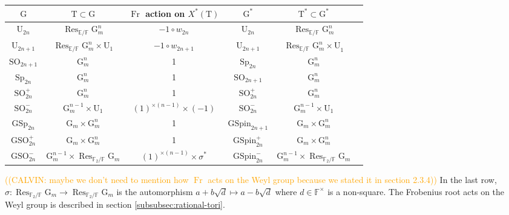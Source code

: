 \documentclass[12pt, reqno]{amsart}
\theoremstyle{definition}
\theoremstyle{definition}
\theoremstyle{definition}
\newcommand{\multiplicativegroup}[1]{#1^{\times}}
\newcommand{\SO}{\mathrm{SO}}
\newcommand{\GSO}{\mathrm{GSO}}
\newcommand{\Sp}{\mathrm{Sp}}
\newcommand{\GSp}{\mathrm{GSp}}
\newcommand{\UnitaryGroup}{\mathrm{U}}
\newcommand{\finiteField}{\mathbb{F}}
\newcommand{\quadraticExtension}{\mathbb{E}}
\newcommand{\finiteFieldExtension}[1]{\finiteField_{#1}}
\newcommand{\Frobenius}{\operatorname{Fr}}
\newcommand{\restrictionOfScalars}[3]{\operatorname{Res}_{#1 \slash #2}{#3}}
\newcommand{\multiplcativeScheme}{\algebraicGroup{G}_m}
\newcommand{\algebraicGroup}[1]{\boldsymbol{\mathrm{#1}}}
\newcommand{\CharacterLattice}[1]{X^{\ast}\left(#1\right)}
\newcommand{\calvin}[1]{\textcolor{orange}{\sffamily ((CALVIN: #1))}}
\begin{document}
\begin{center}
	\begin{tabular}{|c|c|c|c|c|c|} \hline
		$\algebraicGroup{G}$ & $\algebraicGroup{T} \subset \algebraicGroup{G}$ & $\Frobenius$ action on $\CharacterLattice{\algebraicGroup{T}}$ & $\algebraicGroup{G}^{\ast}$ & $\algebraicGroup{T}^{\ast} \subset \algebraicGroup{G}^{\ast}$ \tabularnewline \hline \hline
		$\algebraicGroup{\UnitaryGroup}_{2n}$ & $\restrictionOfScalars{\quadraticExtension}{\finiteField}{\multiplcativeScheme^{n}}$ & $-1\circ w_{2n}$ & $\algebraicGroup{\UnitaryGroup}_{2n}$ &  $\restrictionOfScalars{\quadraticExtension}{\finiteField}{\multiplcativeScheme^{n}}$ \tabularnewline \hline
		$\algebraicGroup{\UnitaryGroup}_{2n+1}$ & $\restrictionOfScalars{\quadraticExtension}{\finiteField}{\multiplcativeScheme^{n}} \times \algebraicGroup{\UnitaryGroup}_1$ & $-1 \circ w_{2n+1}$ & $\algebraicGroup{\UnitaryGroup}_{2n+1}$ &  $\restrictionOfScalars{\quadraticExtension}{\finiteField}{\multiplcativeScheme^{n} \times \algebraicGroup{\UnitaryGroup}}_1$ \tabularnewline \hline		 				 
		$\algebraicGroup{\SO}_{2n+1}$ & $\multiplcativeScheme^n$ & 1 &$\algebraicGroup{\Sp}_{2n}$ &  $\multiplcativeScheme^n$ \tabularnewline \hline
		$\algebraicGroup{\Sp}_{2n}$ & $\multiplcativeScheme^n$ & 1 &$\algebraicGroup{\SO}_{2n+1}$ & $\multiplcativeScheme^n$ \tabularnewline \hline		 
		$\algebraicGroup{\SO}^{+}_{2n}$ & $\multiplcativeScheme^n$ & 1 &$\algebraicGroup{\SO}^{+}_{2n}$ &  $\multiplcativeScheme^n$ \tabularnewline \hline
		$\algebraicGroup{\SO}^{-}_{2n}$ & $\multiplcativeScheme^{n-1} \times \algebraicGroup{\UnitaryGroup}_1$ & $\left(1\right)^{\times {\left(n-1\right)}} \times \left(-1\right)$ &$\algebraicGroup{\SO}^{-}_{2n}$ &  $\multiplcativeScheme^{n-1} \times \algebraicGroup{\UnitaryGroup}_1$ \tabularnewline \hline
		$\algebraicGroup{\GSp}_{2n}$ & $\multiplcativeScheme \times \multiplcativeScheme^{n}$ & 1 &$\algebraicGroup{GSpin}_{2n+1}$ &  $\multiplcativeScheme \times \multiplcativeScheme^{n}$ \tabularnewline \hline
		$\algebraicGroup{\GSO}^{+}_{2n}$ & $\multiplcativeScheme \times \multiplcativeScheme^{n}$ & 1 & $\algebraicGroup{GSpin}_{2n}^{+}$ &  $\multiplcativeScheme \times \multiplcativeScheme^{n}$ \tabularnewline \hline
		$\algebraicGroup{\GSO}^{-}_{2n}$ & $\multiplcativeScheme^{n-1} \times \restrictionOfScalars{\finiteFieldExtension{2}}{\finiteField}{\multiplcativeScheme}$ & $\left(1\right)^{\times {\left(n-1\right)}} \times \sigma^{\ast}$ & $\algebraicGroup{GSpin}_{2n}^{-}$ &  $\multiplcativeScheme^{n-1} \times \restrictionOfScalars{\finiteFieldExtension{2}}{\finiteField}{\multiplcativeScheme}$ \tabularnewline \hline
	\end{tabular}
\end{center}
\calvin{maybe we don't need to mention how $\Frobenius$ acts on the Weyl group because we stated it in section 2.3.4}
In the last row, $\sigma \colon \restrictionOfScalars{\finiteFieldExtension{2}}{\finiteField}{\multiplcativeScheme} \to \restrictionOfScalars{\finiteFieldExtension{2}}{\finiteField}{\multiplcativeScheme}$ is the automorphism $a + b\sqrt{d} \mapsto a - b\sqrt{d}$ where $d \in \multiplicativegroup{\finiteField}$ is a non-square.
The Frobenius root acts on the Weyl group is described in section \ref{subsubsec:rational-tori}. 
\end{document}
